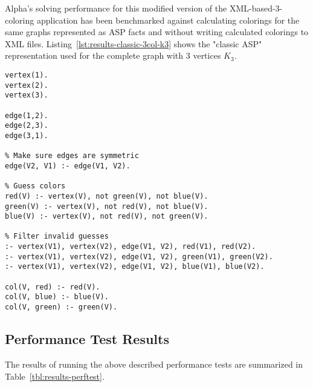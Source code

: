 Alpha's solving performance for this modified version of the XML-based-3-coloring application has been benchmarked against calculating colorings for the same graphs represented as ASP facts and without writing calculated colorings to XML files.
Listing~\ref{lst:results-classic-3col-k3} shows the "classic ASP" representation used for the complete graph with 3 vertices $K_3$.

\begin{lstlisting}[style=asp-code, label={lst:results-classic-3col-k3}, caption={Pure-ASP version of a 3-coloring encoding for the graph $K_3$.}]
vertex(1).
vertex(2).
vertex(3).

edge(1,2).
edge(2,3).
edge(3,1).  

% Make sure edges are symmetric
edge(V2, V1) :- edge(V1, V2).

% Guess colors
red(V) :- vertex(V), not green(V), not blue(V).
green(V) :- vertex(V), not red(V), not blue(V).
blue(V) :- vertex(V), not red(V), not green(V).

% Filter invalid guesses
:- vertex(V1), vertex(V2), edge(V1, V2), red(V1), red(V2).
:- vertex(V1), vertex(V2), edge(V1, V2), green(V1), green(V2).
:- vertex(V1), vertex(V2), edge(V1, V2), blue(V1), blue(V2).

col(V, red) :- red(V).
col(V, blue) :- blue(V).
col(V, green) :- green(V).    
\end{lstlisting}

\subsection{Performance Test Results}
\label{subsec:results-performance-numbers}

The results of running the above described performance tests are summarized in Table~\ref{tbl:results-perftest}.

